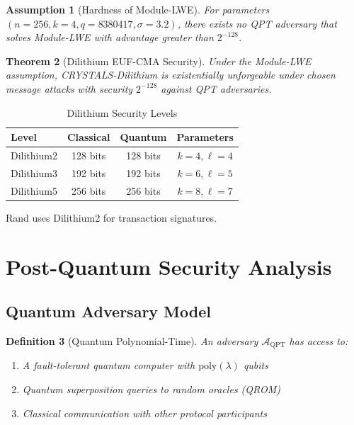 \documentclass[11pt,a4paper]{article}
\newtheorem{theorem}{Theorem}[section]
\newtheorem{definition}[theorem]{Definition}
\newtheorem{assumption}[theorem]{Assumption}
\begin{document}
\begin{assumption}[Hardness of Module-LWE]
For parameters $(n = 256, k = 4, q = 8380417, \sigma = 3.2)$, there exists no QPT adversary that solves Module-LWE with advantage greater than $2^{-128}$.
\end{assumption}

\begin{theorem}[Dilithium EUF-CMA Security]
Under the Module-LWE assumption, CRYSTALS-Dilithium is existentially unforgeable under chosen message attacks with security $2^{-128}$ against QPT adversaries.
\end{theorem}

\begin{table}[h]
\centering
\caption{Dilithium Security Levels}
\begin{tabular}{@{}lccc@{}}
\toprule
\textbf{Level} & \textbf{Classical} & \textbf{Quantum} & \textbf{Parameters} \\ \midrule
Dilithium2 & 128 bits & 128 bits & $k = 4, \ell = 4$ \\
Dilithium3 & 192 bits & 192 bits & $k = 6, \ell = 5$ \\
Dilithium5 & 256 bits & 256 bits & $k = 8, \ell = 7$ \\ \bottomrule
\end{tabular}
\end{table}

Rand uses Dilithium2 for transaction signatures.

\section{Post-Quantum Security Analysis}

\subsection{Quantum Adversary Model}

\begin{definition}[Quantum Polynomial-Time]
An adversary $\mathcal{A}_{\text{QPT}}$ has access to:
\begin{enumerate}
    \item A fault-tolerant quantum computer with $\text{poly}(\lambda)$ qubits
    \item Quantum superposition queries to random oracles (QROM)
    \item Classical communication with other protocol participants
\end{enumerate}
\end{definition}
\end{document}
